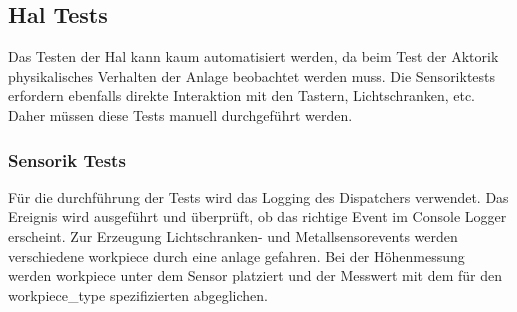 
\subsection{Hal Tests}\label{subsec:hal-tests}

Das Testen der Hal kann kaum automatisiert werden, da beim Test der Aktorik physikalisches Verhalten der Anlage beobachtet werden muss.
Die Sensoriktests erfordern ebenfalls direkte Interaktion mit den Tastern, Lichtschranken, etc.
Daher müssen diese Tests manuell durchgeführt werden. 

\subsubsection{Sensorik Tests}\label{subsubsec:sensorik-tests}
Für die durchführung der Tests wird das Logging des Dispatchers verwendet.
Das Ereignis wird ausgeführt und überprüft, ob das richtige Event im Console Logger erscheint.
Zur Erzeugung Lichtschranken- und Metallsensorevents werden verschiedene \gls{workpiece} durch eine \gls{anlage} gefahren.
Bei der Höhenmessung werden \gls{workpiece} unter dem Sensor platziert und der Messwert mit dem für den \gls{workpiece_type}
spezifizierten abgeglichen.

